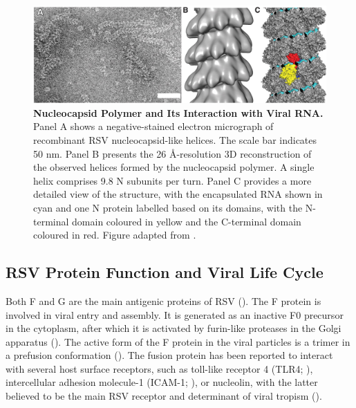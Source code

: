 \begin{figure}
    \centering
    \includegraphics[width=1\linewidth]{04. Introduction//Figs/08. N-structure.jpeg}
    \caption[Nucleocapsid Polymer and Its Interaction with Viral RNA.]{\textbf{Nucleocapsid Polymer and Its Interaction with Viral RNA.} Panel A shows a negative-stained electron micrograph of recombinant RSV nucleocapsid-like helices. The scale bar indicates 50 nm. Panel B presents the 26 \r{A}-resolution 3D reconstruction of the observed helices formed by the nucleocapsid polymer. A single helix comprises 9.8 N subunits per turn. Panel C provides a more detailed view of the structure, with the encapsulated RNA shown in cyan and one N protein labelled based on its domains, with the N-terminal domain coloured in yellow and the C-terminal domain coloured in red. Figure adapted from \cite{Tawar2009CrystalVirus}.}
    \label{fig:Nucleocapsid Polymer and Its Interaction with Viral RNA}
\end{figure}

\subsection{RSV Protein Function and Viral Life Cycle} \label{subsec:RSV Protein Function and Viral Life Cycle}
Both F and G are the main antigenic proteins of RSV (\cite{Collins2011ProgressYears}). The F protein is involved in viral entry and assembly. It is generated as an inactive F0 precursor in the cytoplasm, after which it is activated by furin-like proteases in the Golgi apparatus (\cite{Collins1984NucleotideVirus}). The active form of the F protein in the viral particles is a trimer in a prefusion conformation (\cite{Ternette2007ImmunogenicityVirus}). The fusion protein has been reported to interact with several host surface receptors, such as toll-like receptor 4 (TLR4; \cite{Marr2012RoleReplication}), intercellular adhesion molecule-1 (ICAM-1; \cite{Behera2001BlockingInfection}), or nucleolin, with the latter believed to be the main RSV receptor and determinant of viral tropism (\cite{Tayyari2011IdentificationVirus}). 

